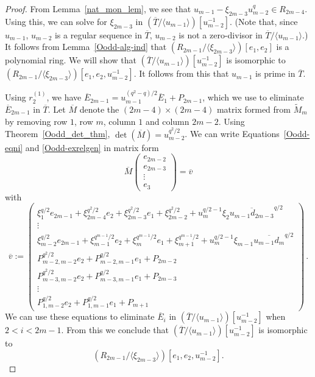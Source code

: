\documentclass[10pt,a4paper]{amsart}
\begin{document}
\begin{proof}
From Lemma~\ref{nat_mon_lem}, we see that $u_{m-1}-\xi_{2m-3}u_{m-2}^q\in R_{2m-4}$.
Using this, we can solve for $\xi_{2m-3}$ in $(\overline{T}/\langle u_{m-1}\rangle)[u_{m-2}^{-1}]$.
(Note that, since $u_{m-1}$, $u_{m-2}$ is a regular sequence in $\overline{T}$, $u_{m-2}$ is not a zero-divisor in $\overline{T}/\langle u_{m-1}\rangle$.)
It follows from Lemma~\ref{Oodd-alg-ind} that $(R_{2m-1}/\langle \xi_{2m-3}\rangle)[e_1,e_2]$ is a polynomial ring.
We will show that $(\overline{T}/\langle u_{m-1}\rangle)[u_{m-2}^{-1}]$ is isomorphic to $(R_{2m-1}/\langle \xi_{2m-3}\rangle)[e_1,e_2,u_{m-2}^{-1}]$.
It follows from this that $u_{m-1}$ is prime in $\overline{T}$. 

Using $r_2^{(1)}$, we have $\overline{E}_{2m-1}=u_{m-1}^{(q^2-q)/2}\overline{E}_1+P_{2m-1}$, which we use to eliminate $\overline{E}_{2m-1}$ in $\overline{T}$.
Let $\overline{M}$ denote the $(2m-4)\times(2m-4)$ matrix formed from $\widetilde{M}_m$ by removing row $1$, row $m$, column $1$ and column $2m-2$.
Using Theorem~\ref{Oodd_det_thm}, $\det(\overline{M})=u_{m-2}^{q^2/2}$.
We can write Equations~\ref{Oodd-eqni} and \ref{Oodd-exrelgen} in matrix form 
$$\overline{M}\begin{pmatrix} e_{2m-2}\\e_{2m-3} \\ \vdots\\ e_3 \end{pmatrix} =\overline{v}$$
with
    $$
        \overline{v}:=\begin{pmatrix} \xi_1^{q/2}e_{2m-1}+\xi_{2m-4}^{q^2/2}e_2
        +\xi_{2m-3}^{q^2/2}e_1+\xi_{2m-2}^{q^2/2}+u_m^{q/2-1}\xi_2\overline{u_{m-1}d_{2m-3}}^{q/2} \\ 
        \vdots\\
        \xi_{m-2}^{q/2}e_{2m-1}+\xi_{m-1}^{q^{m-1}/2}e_2
        +\xi_m^{q^{m-1}/2}e_1+\xi_{m+1}^{q^{m-1}/2}+u_m^{q/2-1}\xi_{m-1}\overline{u_{m-1}d_m}^{q/2} \\ 
        P^{q^2/2}_{m-2,m-2}e_2+P^{q/2}_{m-2,m-1} e_1+P_{2m-2}\\
        P^{q^2/2}_{m-3,m-2}e_2+P^{q/2}_{m-3,m-1} e_1+P_{2m-3}\\
        \vdots\\
        P_{1,m-2}^{q/2} e_2+P_{1,m-1}^{q/2} e_1+P_{m+1}\end{pmatrix}\, .
    $$
We can use these equations to eliminate $\overline{E}_i$ in $(\overline{T}/\langle u_{m-1}\rangle)[u_{m-2}^{-1}]$ when $2<i<2m-1$.
From this we conclude that $(\overline{T}/\langle u_{m-1}\rangle)[u_{m-2}^{-1}]$ is isomorphic to $$(R_{2m-1}/\langle \xi_{2m-3}\rangle)[e_1,e_2,u_{m-2}^{-1}].$$


\end{proof}
\end{document}
